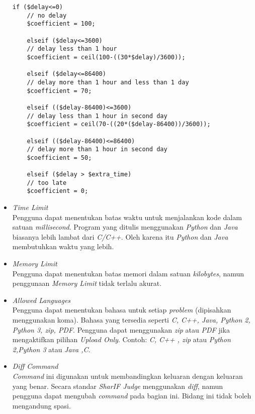 \begin{itemize}
	\begin{lstlisting}[basicstyle=\ttfamily, frame=single,
	columns=fullflexible, keepspaces=true, breaklines=true, label=ls:7]
	if ($delay<=0)
	// no delay
	$coefficient = 100;
	
	elseif ($delay<=3600)
	// delay less than 1 hour
	$coefficient = ceil(100-((30*$delay)/3600));
	
	elseif ($delay<=86400)
	// delay more than 1 hour and less than 1 day
	$coefficient = 70;
	
	elseif (($delay-86400)<=3600)
	// delay less than 1 hour in second day
	$coefficient = ceil(70-((20*($delay-86400))/3600));
	
	elseif (($delay-86400)<=86400)
	// delay more than 1 hour in second day
	$coefficient = 50;
	
	elseif ($delay > $extra_time)
	// too late
	$coefficient = 0;
	\end{lstlisting}
	
	\item \textit{Time Limit} \\
	Pengguna dapat menentukan batas waktu untuk menjalankan kode dalam satuan \textit{millisecond}. Program yang ditulis menggunakan \textit{Python} dan \textit{Java} biasanya lebih lambat dari \textit{C/C++}. Oleh karena itu \textit{Python} dan \textit{Java} membutuhkan waktu yang lebih.
	
	\item \textit{Memory Limit} \\
	Pengguna dapat menentukan batas memori dalam satuan \textit{kilobytes}, namun penggunaan \textit{Memory Limit} tidak terlalu akurat.
	
	\item \textit{Allowed Languages} \\
	Pengguna dapat menentukan bahasa untuk setiap \textit{problem} (dipisahkan menggunakan koma). Bahasa yang tersedia seperti \textit{C, C++, Java, Python 2, Python 3, zip, PDF}. Pengguna dapat menggunakan \textit{zip} atau \textit{PDF} jika mengaktifkan pilihan \textit{Upload Only}. Contoh: \textit{C, C++ , zip} atau \textit{Python 2,Python 3} atau \textit{Java ,C}.
	
	\item \textit{Diff Command} \\
	\textit{Command} ini digunakan untuk membandingkan keluaran dengan keluaran yang benar. Secara standar \textit{SharIF Judge} menggunakan \textit{diff}, namun pengguna dapat mengubah \textit{command} pada bagian ini. Bidang ini tidak boleh mengandung spasi.
	

\end{itemize}
